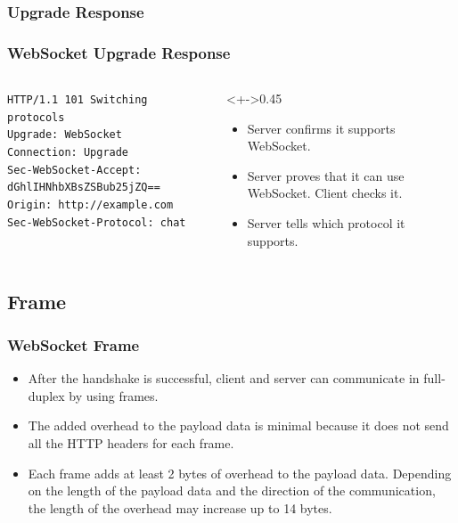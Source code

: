 \documentclass{beamer}
\begin{document}
\subsubsection{Upgrade Response}
\begin{frame}
    \frametitle{WebSocket Upgrade Response}
    \begin{columns}
        \begin{column}{0.6\textwidth}
            \texttt{HTTP/1.1 \alert<2>{101 Switching protocols}\\
                \alert<2>{Upgrade: WebSocket}\\
                \alert<2>{Connection: Upgrade}\\
                \alert<3>{Sec-WebSocket-Accept: dGhlIHNhbXBsZSBub25jZQ==}\\
                Origin: http://example.com\\
                \alert<4>{Sec-WebSocket-Protocol: chat}
            }
        \end{column}
        \begin{column}<+->{0.45\textwidth}
            \begin{itemize}
                \item<2-| alert@2> Server confirms it supports WebSocket.
                \item<3-| alert@3> Server proves that it can use WebSocket. Client checks it.
                \item<4-| alert@4> Server tells which protocol it supports.
            \end{itemize}
        \end{column}
    \end{columns}
\end{frame}

\subsection{Frame}
\begin{frame}
    \frametitle{WebSocket Frame}
    \begin{itemize}[<+->]
        \item After the handshake is successful, client and server can \alert{communicate in
                  full-duplex} by using frames.
        \item The added \alert{overhead} to the payload data is \alert{minimal} because it
              does not send all the HTTP headers for each frame.
        \item Each frame adds \alert{at least 2 bytes of overhead} to the payload data.
              Depending on the length of the payload data and the direction of the
              communication, the length of the overhead \alert{may increase up to 14 bytes}.
    \end{itemize}
\end{frame}
\end{document}
